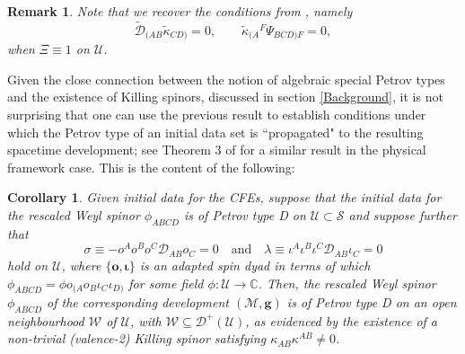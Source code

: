 \documentclass[10pt,a4paper]{article}
\theoremstyle{plain}
\newtheorem{corollary}{Corollary}
\newtheorem{remark}{Remark}
\def\bmg{{\bm g}}
\def\bmo{{\bm o}}
\begin{document}
\begin{remark}{\em 
Note that we recover the conditions from \cite{BaeVal10a}, namely
\[\tilde{\mathcal{D}}_{(AB}\tilde{\kappa}_{CD)}=0, \qquad \tilde{\kappa}_{(A}{}^F
\Psi_{BCD)F}=0, \] when $\Xi\equiv 1$ on $\mathcal{U}$.  }
\end{remark}
Given the close connection between the notion of algebraic special Petrov types
and the existence of Killing spinors, discussed in section
\ref{Background}, it is not surprising that one can use the previous
result to establish conditions under which the Petrov type of an
initial data set is ``propagated" to the resulting spacetime
development; see Theorem 3 of \cite{GarVal08c} for a similar result in
the physical framework case. This is the content of the following:

\begin{corollary}\label{Corollary:PetrovPropagation}
  Given initial data for the CFEs, suppose that the initial data for the rescaled Weyl spinor
  $\phi_{ABCD}$ is of Petrov type D on $\mathcal{U}\subset\mathcal{S}$
  and suppose further that
\begin{equation} 
\sigma\equiv - o^A o^B o^C\mathcal{D}_{AB}o_C=0 \quad \text{and}\quad
\lambda\equiv
\iota^A\iota^B\iota^C\mathcal{D}_{AB}\iota_C=0\label{ShearConditions}
\end{equation}
hold on $\mathcal{U}$, where $\lbrace \bmo, \bm\iota\rbrace$ is an
adapted spin dyad in terms of which $\phi_{ABCD}=\phi
o_{(A}o_B\iota_C\iota_{D)}$ for some field $\phi:\mathcal{U}\rightarrow\mathbb{C}$.  Then, the rescaled
Weyl spinor $\phi_{ABCD}$ of the corresponding development $(\mathcal{M},\bmg)$ 
is of Petrov type D on an open neighbourhood $\mathcal{W}$ of
$\mathcal{U}$, with $\mathcal{W}\subseteq\mathcal{D}^+(\mathcal{U})$, as evidenced by the
existence of a non-trivial (valence-2) Killing spinor satisfying
$\kappa_{AB}\kappa^{AB}\neq 0$.
\end{corollary}
\end{document}
